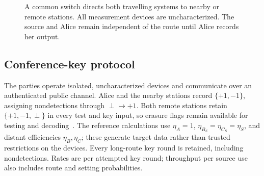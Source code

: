 \documentclass[aps,10pt,onecolumn,prx,superscriptaddress,longbibliography,nofootinbib]{revtex4-2}
\newcommand{\perpout}{\perp}
\begin{document}
\begin{figure}[htbp]
\centering
{}
\caption{A common switch directs both travelling systems to nearby or remote stations. All measurement devices are uncharacterized. The source and Alice remain independent of the route until Alice records her output.}
\label{fig:architecture}
\end{figure}

\subsection{Conference-key protocol}\label{sec:conference-protocol}

The parties operate isolated, uncharacterized devices and communicate over an authenticated public channel. Alice and the nearby stations record \(\{+1,-1\}\), assigning nondetections through \(\perpout\mapsto+1\). Both remote stations retain \(\{+1,-1,\perpout\}\) in every test and key input, so erasure flags remain available for testing and decoding~\cite{LeRoy2025}. The reference calculations use \(\eta_A=1\), \(\eta_{B_S}=\eta_{C_S}=\eta_S\), and distant efficiencies \(\eta_B,\eta_C\); these generate target data rather than trusted restrictions on the devices. Every long-route key round is retained, including nondetections. Rates are per attempted key round; throughput per source use also includes route and setting probabilities.
\end{document}
